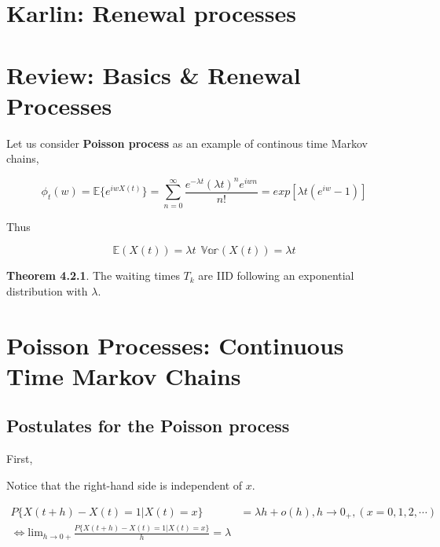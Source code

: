 \documentclass[12pt]{article}
\theoremstyle{nonumberbreak}
\begin{document}
\pagebreak
\section*{Karlin: Renewal processes}
\setcounter{section}{0}


\section{Review: Basics \& Renewal Processes}



Let us consider \textbf{Poisson process} as an example of continous time Markov chains,

$$
\phi_t (w) = \mathbb{E} \{ e^{iwX(t)} \} = \sum_{n=0}^\infty \frac{e^{-\lambda t} (\lambda t)^n e^{iwn}}{n!} = exp[\lambda t (e^{iw} -1)]
$$

Thus 

$$
\mathbb{E} (X(t)) = \lambda t \ \ \mathbb{Var}(X(t)) = \lambda t
$$


\begin{theorem}
\textbf{Theorem 4.2.1}. The waiting times $T_k$ are IID following an exponential distribution with $\lambda$. 
\end{theorem}



\section{Poisson Processes: Continuous Time Markov Chains}


\subsection{Postulates for the Poisson process}


First, 

Notice that the right-hand side is independent of $x$. 

$$
\begin{aligned}
P\{ X(t+h) - X(t) = 1 | X(t) = x \} &= \lambda h + o(h), h \to 0_+, (x=0,1,2,\cdots) \\[10pt]
\Leftrightarrow \mathrm{lim}_{h \to 0+} \frac{P\{ X(t+h) - X(t) = 1 | X(t) = x \}}{h} = \lambda
\end{aligned}
$$
\end{document}
